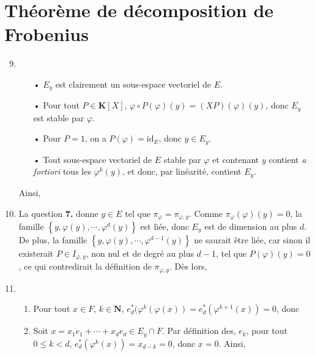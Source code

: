 \documentclass[a4paper,11pt]{article}
\newcommand{\N}{\mathbf{N}}
\newcommand{\K}{\mathbf{K}}
\begin{document}
\section{Théorème de décomposition de Frobenius}
\begin{enumerate}
\setcounter{enumi}{8}
\item 
\begin{itemize}
\item[•] $E_y$ est clairement un sous-espace vectoriel de $E$.
\item[•] Pour tout $P\in\K[X]$, $\varphi\circ P(\varphi)(y)=(XP)(\varphi)(y)$, donc $E_y$ est stable par $\varphi$.
\item[•] Pour $P=1$, on a $P(\varphi)=\mathrm{id}_E$, donc $y\in E_y$.
\item[•] Tout sous-espace vectoriel de $E$ stable par $\varphi$ et contenant $y$ contient \textit{a fortiori} tous les $\varphi^k(y)$, et donc, par linéarité, contient $E_y$.
\end{itemize}
Ainsi,
\begin{center}
\end{center}
\item La question {\sffamily\bfseries 7.} donne $y\in E$ tel que $\pi_\varphi=\pi_{\varphi,y}$. Comme $\pi_\varphi(\varphi)(y)=0$, la famille $\left\lbrace y,\varphi(y),\cdots,\varphi^{d}(y)\right\rbrace$ est liée, donc $E_y$ est de dimension au plus $d$. De plus, la famille $\left\lbrace y,\varphi(y),\cdots,\varphi^{d-1}(y)\right\rbrace$ ne saurait être liée, car sinon il existerait $P\in I_{\varphi,y}$, non nul et de degré au plus $d-1$, tel que $P(\varphi)(y)=0$, ce qui contredirait la définition de $\pi_{\varphi,y}$. Dès lors,
\begin{center}
\end{center}
\item
\begin{enumerate}
\item Pour tout $x\in F$, $k\in\N$, $e_d^*(\varphi^k(\varphi(x))=e_d^*(\varphi^{k+1}(x))=0$, donc
\begin{center}
\end{center}
\item Soit $x=x_1e_1+\cdots+x_de_d\in E_y\cap F$. Par définition des, $e_k$, pour tout $0\leq k<d$, $e_d^*(\varphi^k(x))=x_{d-k}=0$, donc $x=0$. Ainsi,

\end{enumerate}
\end{enumerate}
\end{document}
